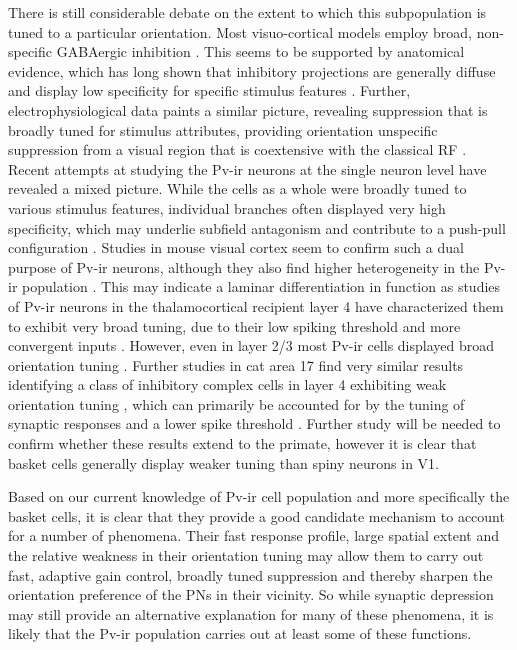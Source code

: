 There is still considerable debate on the extent to which this
subpopulation is tuned to a particular orientation. Most
visuo-cortical models employ broad, non-specific GABAergic inhibition
\citep{Somers1998,Troyer1998}. This seems to be supported by
anatomical evidence, which has long shown that inhibitory projections
are generally diffuse and display low specificity for specific
stimulus features \citep{Albus1994,Kisvarday1997a}. Further,
electrophysiological data paints a similar picture, revealing
suppression that is broadly tuned for stimulus attributes, providing
orientation unspecific suppression from a visual region that is
coextensive with the classical RF \citep{DeAngelis1992}. Recent
attempts at studying the Pv-ir neurons at the single neuron level have
revealed a mixed picture. While the cells as a whole were broadly
tuned to various stimulus features, individual branches often
displayed very high specificity, which may underlie subfield
antagonism and contribute to a push-pull configuration
\citep{Kisvarday2002}. Studies in mouse visual cortex seem to confirm
such a dual purpose of Pv-ir neurons, although they also find higher
heterogeneity in the Pv-ir population \citep{Runyan2010}. This may
indicate a laminar differentiation in function as studies of Pv-ir
neurons in the thalamocortical recipient layer 4 have characterized
them to exhibit very broad tuning, due to their low spiking threshold
and more convergent inputs \citep{Ma2011}. However, even in layer 2/3
most Pv-ir cells displayed broad orientation tuning
\citep{Hofer2011}. Further studies in cat area 17 find very similar
results identifying a class of inhibitory complex cells in layer 4
exhibiting weak orientation tuning \citep{Hirsch2003}, which can
primarily be accounted for by the tuning of synaptic responses and a
lower spike threshold \citep{Nowak2008}. Further study will be needed
to confirm whether these results extend to the primate, however it is
clear that basket cells generally display weaker tuning than spiny
neurons in V1.

Based on our current knowledge of Pv-ir cell population and more
specifically the basket cells, it is clear that they provide a good
candidate mechanism to account for a number of phenomena. Their fast
response profile, large spatial extent and the relative weakness in
their orientation tuning may allow them to carry out fast, adaptive
gain control, broadly tuned suppression and thereby sharpen the
orientation preference of the PNs in their vicinity. So while synaptic
depression may still provide an alternative explanation for many of
these phenomena, it is likely that the Pv-ir population carries out at
least some of these functions.

